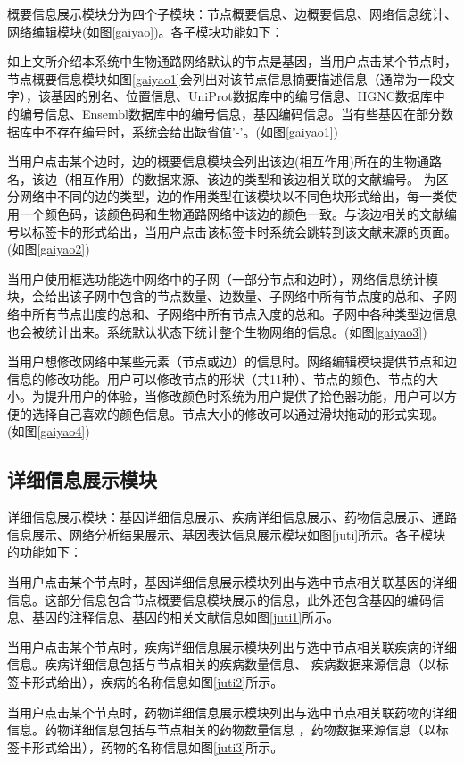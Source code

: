 概要信息展示模块分为四个子模块：节点概要信息、边概要信息、网络信息统计、网络编辑模块(如图\ref{gaiyao})。各子模块功能如下：

如上文所介绍本系统中生物通路网络默认的节点是基因，当用户点击某个节点时，节点概要信息模块如图\ref{gaiyao1}会列出对该节点信息摘要描述信息（通常为一段文字），该基因的别名、位置信息、UniProt\cite{uniprot2014uniprot}数据库中的编号信息、HGNC\cite{povey2001hugo}数据库中的编号信息、Ensembl\cite{cunningham2014ensembl}数据库中的编号信息，基因编码信息。当有些基因在部分数据库中不存在编号时，系统会给出缺省值'-'。(如图\ref{gaiyao1})

当用户点击某个边时，边的概要信息模块会列出该边(相互作用)所在的生物通路名，该边（相互作用）的数据来源、该边的类型和该边相关联的文献编号。 为区分网络中不同的边的类型，边的作用类型在该模块以不同色块形式给出，每一类使用一个颜色码，该颜色码和生物通路网络中该边的颜色一致。与该边相关的文献编号以标签卡的形式给出，当用户点击该标签卡时系统会跳转到该文献来源的页面。(如图\ref{gaiyao2})

当用户使用框选功能选中网络中的子网（一部分节点和边时），网络信息统计模块，会给出该子网中包含的节点数量、边数量、子网络中所有节点度的总和、子网络中所有节点出度的总和、子网络中所有节点入度的总和。子网中各种类型边信息也会被统计出来。系统默认状态下统计整个生物网络的信息。(如图\ref{gaiyao3})

当用户想修改网络中某些元素（节点或边）的信息时。网络编辑模块提供节点和边信息的修改功能。用户可以修改节点的形状（共11种）、节点的颜色、节点的大小。为提升用户的体验，当修改颜色时系统为用户提供了拾色器功能，用户可以方便的选择自己喜欢的颜色信息。节点大小的修改可以通过滑块拖动的形式实现。(如图\ref{gaiyao4})

\subsection{详细信息展示模块}
详细信息展示模块：基因详细信息展示、疾病详细信息展示、药物信息展示、通路信息展示、网络分析结果展示、基因表达信息展示模块如图\ref{juti}所示。各子模块的功能如下：

当用户点击某个节点时，基因详细信息展示模块列出与选中节点相关联基因的详细信息。这部分信息包含节点概要信息模块展示的信息，此外还包含基因的编码信息、基因的注释信息、基因的相关文献信息如图\ref{juti1}所示。

当用户点击某个节点时，疾病详细信息展示模块列出与选中节点相关联疾病的详细信息。疾病详细信息包括与节点相关的疾病数量信息、
疾病数据来源信息（以标签卡形式给出），疾病的名称信息如图\ref{juti2}所示。

当用户点击某个节点时，药物详细信息展示模块列出与选中节点相关联药物的详细信息。药物详细信息包括与节点相关的药物数量信息
，药物数据来源信息（以标签卡形式给出），药物的名称信息如图\ref{juti3}所示。


